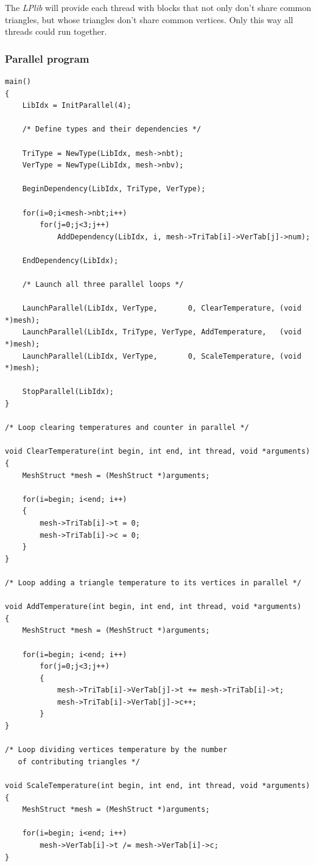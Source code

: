 \documentclass[a4paper,12pt]{article}
\begin{document}
The \emph{LPlib} will provide each thread with blocks that not only don't share common triangles, but whose triangles don't share common vertices. Only this way all threads could run together.

\subsubsection{Parallel program}

\begin{tt}
\begin{verbatim}
main()
{
    LibIdx = InitParallel(4);

    /* Define types and their dependencies */

    TriType = NewType(LibIdx, mesh->nbt);
    VerType = NewType(LibIdx, mesh->nbv);

    BeginDependency(LibIdx, TriType, VerType);

    for(i=0;i<mesh->nbt;i++)
        for(j=0;j<3;j++)
            AddDependency(LibIdx, i, mesh->TriTab[i]->VerTab[j]->num);

    EndDependency(LibIdx);

    /* Launch all three parallel loops */

    LaunchParallel(LibIdx, VerType,       0, ClearTemperature, (void *)mesh);
    LaunchParallel(LibIdx, TriType, VerType, AddTemperature,   (void *)mesh);
    LaunchParallel(LibIdx, VerType,       0, ScaleTemperature, (void *)mesh);

    StopParallel(LibIdx);
}

/* Loop clearing temperatures and counter in parallel */

void ClearTemperature(int begin, int end, int thread, void *arguments)
{
    MeshStruct *mesh = (MeshStruct *)arguments;

    for(i=begin; i<end; i++)
    {
        mesh->TriTab[i]->t = 0;
        mesh->TriTab[i]->c = 0;
    }
}

/* Loop adding a triangle temperature to its vertices in parallel */

void AddTemperature(int begin, int end, int thread, void *arguments)
{
    MeshStruct *mesh = (MeshStruct *)arguments;

    for(i=begin; i<end; i++)
        for(j=0;j<3;j++)
        {
            mesh->TriTab[i]->VerTab[j]->t += mesh->TriTab[i]->t;
            mesh->TriTab[i]->VerTab[j]->c++;
        }
}

/* Loop dividing vertices temperature by the number
   of contributing triangles */

void ScaleTemperature(int begin, int end, int thread, void *arguments)
{
    MeshStruct *mesh = (MeshStruct *)arguments;

    for(i=begin; i<end; i++)
        mesh->VerTab[i]->t /= mesh->VerTab[i]->c;
}
\end{verbatim}
\end{tt}
\normalfont
\end{document}
